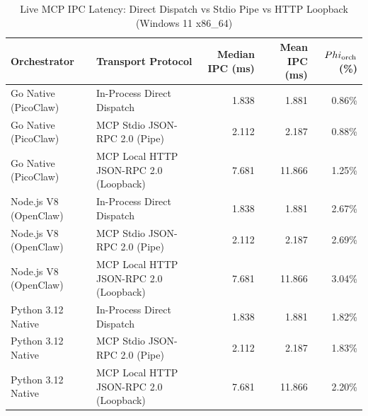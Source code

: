 \begin{table}[t]
\centering\small
\caption{Live MCP IPC Latency: Direct Dispatch vs Stdio Pipe vs HTTP Loopback (Windows 11 x86_64)}
\label{tab:Windows_mcp_transport}
\begin{tabular}{llrrr}
\toprule
Orchestrator & Transport Protocol & Median IPC (ms) & Mean IPC (ms) & $\\Phi_{\text{orch}}$ (\%) \\
\midrule
Go Native (PicoClaw) & In-Process Direct Dispatch & 1.838 & 1.881 & 0.86\% \\
Go Native (PicoClaw) & MCP Stdio JSON-RPC 2.0 (Pipe) & 2.112 & 2.187 & 0.88\% \\
Go Native (PicoClaw) & MCP Local HTTP JSON-RPC 2.0 (Loopback) & 7.681 & 11.866 & 1.25\% \\
Node.js V8 (OpenClaw) & In-Process Direct Dispatch & 1.838 & 1.881 & 2.67\% \\
Node.js V8 (OpenClaw) & MCP Stdio JSON-RPC 2.0 (Pipe) & 2.112 & 2.187 & 2.69\% \\
Node.js V8 (OpenClaw) & MCP Local HTTP JSON-RPC 2.0 (Loopback) & 7.681 & 11.866 & 3.04\% \\
Python 3.12 Native & In-Process Direct Dispatch & 1.838 & 1.881 & 1.82\% \\
Python 3.12 Native & MCP Stdio JSON-RPC 2.0 (Pipe) & 2.112 & 2.187 & 1.83\% \\
Python 3.12 Native & MCP Local HTTP JSON-RPC 2.0 (Loopback) & 7.681 & 11.866 & 2.20\% \\
\bottomrule
\end{tabular}
\end{table}
